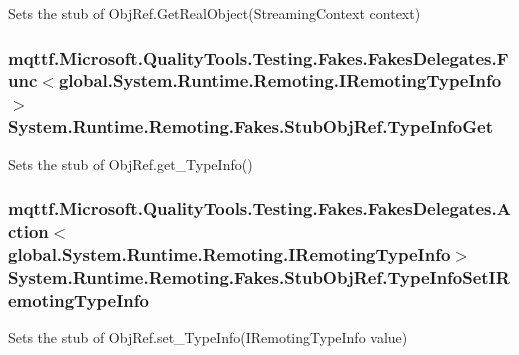 Sets the stub of Obj\-Ref.\-Get\-Real\-Object(\-Streaming\-Context context)

\hypertarget{class_system_1_1_runtime_1_1_remoting_1_1_fakes_1_1_stub_obj_ref_a40bf3537add0eb3283f180c0bfcd102f}{
\subsubsection[{Type\-Info\-Get}]{\setlength{\rightskip}{0pt plus 5cm}mqttf.\-Microsoft.\-Quality\-Tools.\-Testing.\-Fakes.\-Fakes\-Delegates.\-Func$<$global.\-System.\-Runtime.\-Remoting.\-I\-Remoting\-Type\-Info$>$ System.\-Runtime.\-Remoting.\-Fakes.\-Stub\-Obj\-Ref.\-Type\-Info\-Get}}\label{class_system_1_1_runtime_1_1_remoting_1_1_fakes_1_1_stub_obj_ref_a40bf3537add0eb3283f180c0bfcd102f}


Sets the stub of Obj\-Ref.\-get\-\_\-\-Type\-Info()

\hypertarget{class_system_1_1_runtime_1_1_remoting_1_1_fakes_1_1_stub_obj_ref_a0876c833d8fcbb1cb80e5327ab2c02c7}{
\subsubsection[{Type\-Info\-Set\-I\-Remoting\-Type\-Info}]{\setlength{\rightskip}{0pt plus 5cm}mqttf.\-Microsoft.\-Quality\-Tools.\-Testing.\-Fakes.\-Fakes\-Delegates.\-Action$<$global.\-System.\-Runtime.\-Remoting.\-I\-Remoting\-Type\-Info$>$ System.\-Runtime.\-Remoting.\-Fakes.\-Stub\-Obj\-Ref.\-Type\-Info\-Set\-I\-Remoting\-Type\-Info}}\label{class_system_1_1_runtime_1_1_remoting_1_1_fakes_1_1_stub_obj_ref_a0876c833d8fcbb1cb80e5327ab2c02c7}


Sets the stub of Obj\-Ref.\-set\-\_\-\-Type\-Info(\-I\-Remoting\-Type\-Info value)

